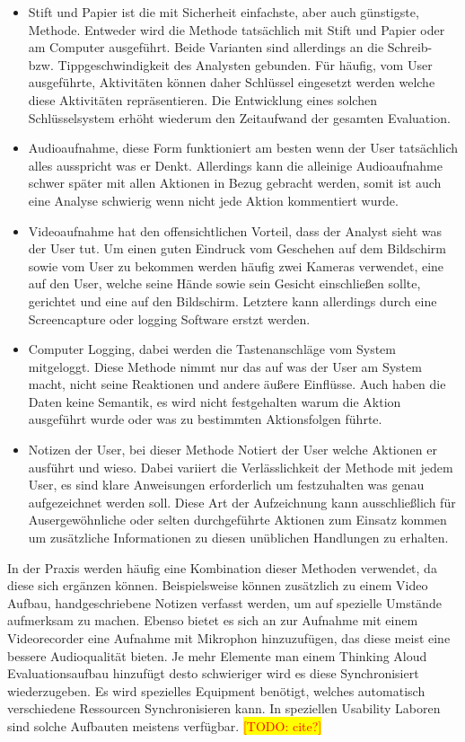 \documentclass[draft=false
              ,paper=a4
              ,twoside=false
              ,fontsize=11pt
              ,headsepline
              ,BCOR10mm
              ,DIV11
              ]{scrbook}
\newcommand{\TODO}[1]{\colorbox{yellow}{\textcolor{red}{[TODO: #1]}}}
\begin{document}
\begin{itemize}
  \item Stift und Papier ist die mit Sicherheit einfachste, aber auch günstigste, Methode. Entweder wird die Methode tatsächlich mit Stift und Papier oder am Computer ausgeführt. Beide Varianten sind allerdings an die Schreib- bzw. Tippgeschwindigkeit des Analysten gebunden. Für häufig, vom User ausgeführte, Aktivitäten können daher Schlüssel eingesetzt werden welche diese Aktivitäten repräsentieren. Die Entwicklung eines solchen Schlüsselsystem erhöht wiederum den Zeitaufwand der gesamten Evaluation.
  \item Audioaufnahme, diese Form funktioniert am besten wenn der User tatsächlich alles ausspricht was er Denkt. Allerdings kann die alleinige Audioaufnahme schwer später mit allen Aktionen in Bezug gebracht werden, somit ist auch eine Analyse schwierig wenn nicht jede Aktion kommentiert wurde.
  \item Videoaufnahme hat den offensichtlichen Vorteil, dass der Analyst sieht was der User tut. Um einen guten Eindruck vom Geschehen auf dem Bildschirm sowie vom User zu bekommen werden häufig zwei Kameras verwendet, eine auf den User, welche seine Hände sowie sein Gesicht einschließen sollte, gerichtet und eine auf den Bildschirm. Letztere kann allerdings durch eine Screencapture oder logging Software erstzt werden. 
  \item Computer Logging, dabei werden die Tastenanschläge vom System mitgeloggt. Diese Methode nimmt nur das auf was der User am System macht, nicht seine Reaktionen und andere äußere Einflüsse. Auch haben die Daten keine Semantik, es wird nicht festgehalten warum die Aktion ausgeführt wurde oder was zu bestimmten Aktionsfolgen führte. 
  \item Notizen der User, bei dieser Methode Notiert der User welche Aktionen er ausführt und wieso. Dabei variiert die Verlässlichkeit der Methode mit jedem User, es sind klare Anweisungen erforderlich um festzuhalten was genau aufgezeichnet werden soll. Diese Art der Aufzeichnung kann ausschließlich für Ausergewöhnliche oder selten durchgeführte Aktionen zum Einsatz kommen um zusätzliche Informationen zu diesen unüblichen Handlungen zu erhalten.
\end{itemize}

In der Praxis werden häufig eine Kombination dieser Methoden verwendet, da diese sich ergänzen können. Beispielsweise können zusätzlich zu einem Video Aufbau, handgeschriebene Notizen verfasst werden, um auf spezielle Umstände aufmerksam zu machen. Ebenso bietet es sich an zur Aufnahme mit einem Videorecorder eine Aufnahme mit Mikrophon hinzuzufügen, das diese meist eine bessere Audioqualität bieten. Je mehr Elemente man einem Thinking Aloud Evaluationsaufbau hinzufügt desto schwieriger wird es diese Synchronisiert wiederzugeben. Es wird spezielles Equipment benötigt, welches automatisch verschiedene Ressourcen Synchronisieren kann. In speziellen Usability Laboren sind solche Aufbauten meistens verfügbar. \TODO{cite?}
\end{document}
